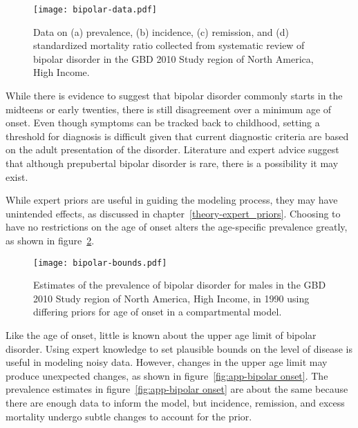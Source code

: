     \begin{figure}[h]
        \begin{center}
            \texttt{[image: bipolar-data.pdf]}
            \caption{Data on (a) prevalence, (b) incidence, (c) remission, and
              (d) standardized mortality ratio collected from systematic review 
              of bipolar disorder in the GBD 2010 Study
              region of North America, High Income.}
            \label{fig:app-bipolar data}
        \end{center}
    \end{figure}

While there is evidence to suggest that bipolar disorder commonly
starts in the midteens or early twenties, there is still disagreement
over a minimum age of onset.  Even though symptoms can be tracked back
to childhood, setting a threshold for diagnosis is difficult given
that current diagnostic criteria are based on the adult presentation of
the disorder.  Literature and expert advice suggest that although
prepubertal bipolar disorder is rare, there is a possibility it may
exist. \cite{kloos_bipolar_2011, angst_historical_2000}

While expert priors are useful in guiding the modeling process, they
may have unintended effects, as discussed in chapter~\ref{theory-expert_priors}.
Choosing to have no restrictions on the
age of onset alters the age-specific prevalence greatly, as shown in
figure~\ref{fig:app-bipolar bounds}.

    \begin{figure}[h]
        \begin{center}
            \texttt{[image: bipolar-bounds.pdf]}
            \caption{Estimates of the prevalence of bipolar disorder
              for males in the GBD 2010 Study region of North America, High Income,
              in 1990 using differing priors for age of onset
              in a compartmental model.}
            \label{fig:app-bipolar bounds}
        \end{center}
    \end{figure}

Like the age of onset, little is known about the upper age limit of
bipolar disorder.  Using expert knowledge to set plausible bounds on the
level of disease is useful in modeling noisy data.  However, changes in the upper age
limit may produce unexpected changes, as shown in figure~\ref{fig:app-bipolar onset}.
The prevalence estimates in figure~\ref{fig:app-bipolar onset} are about
the same because there are enough data to inform the model, but incidence,
remission, and excess mortality undergo subtle changes to account for the prior.

